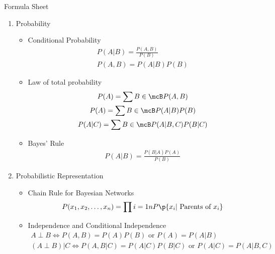 \documentclass[10pt, oneside]{article}
\begin{document}
Formula Sheet
  \begin{enumerate}
    \item Probability
      \begin{multicols}{3}
      \begin{itemize}
        \item Conditional Probability
          \begin{gather*}
            P(A|B) = \frac{P(A, B)}{P(B)} \\
            P(A,B) = P(A|B)P(B)
          \end{gather*}

        \item Law of total probability
          \begin{gather*}
            P(A) = \sum{B \in \mcB}{}{P(A, B)} \\
            P(A) = \sum{B \in \mcB}{}{P(A|B)P(B)} \\
            P(A|C) = \sum{B \in \mcB}{}{P(A|B,C)P(B|C)}
          \end{gather*}

        \item Bayes' Rule
          \begin{gather*}
            P(A|B) = \frac{P(B|A)P(A)}{P(B)}
          \end{gather*}
      \end{itemize}
      \end{multicols}

    \item Probabilistic Representation
      \begin{itemize}
        \item Chain Rule for Bayesian Networks
          \begin{gather*}
            P(x_1, x_2, \ldots, x_n) = \prod{i = 1}{n}{P\p{x_i| \text{ Parents of }x_i}}
          \end{gather*}

        \item Independence and Conditional Independence
          \begin{gather*}
            A \perp B \Leftrightarrow P(A, B) = P(A)P(B) \text{ or } P(A) = P(A|B) \\
            (A \perp B) | C \Leftrightarrow P(A, B| C) = P(A|C) P(B|C) \text{ or } P(A | C) = P(A| B, C)
          \end{gather*}


\end{itemize}
\end{enumerate}
\end{document}
